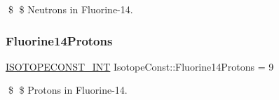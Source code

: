 \$ \$ Neutrons in Fluorine-\/14. \mbox{\label{group___isotope_const-_fluorine-_f14_gae9206a380ec5faae7c495ca36b63ba54}} 
\subsubsection{\texorpdfstring{Fluorine14\+Protons}{Fluorine14Protons}}
{\footnotesize\ttfamily \mbox{\hyperlink{group___isotope_const-_macros_ga5f18360b3e99483a35c32d789e62621c}{I\+S\+O\+T\+O\+P\+E\+C\+O\+N\+S\+T\+\_\+\+I\+NT}} Isotope\+Const\+::\+Fluorine14\+Protons = 9}

\$ \$ Protons in Fluorine-\/14. 